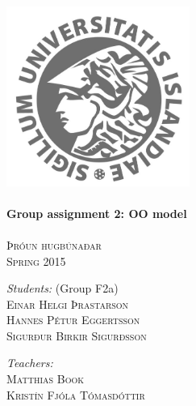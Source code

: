 \documentclass{article}
\begin{document}
\begin{titlepage}
\begin{center}
\textsc{}\\[2cm] 

\includegraphics[width=6cm]{Haskoli_Islands_rett.jpg}\\[0.5cm]

\HRule \\[0.6cm]
{ \huge \bfseries Group assignment 2: OO model}\\[0.2cm]
\HRule \\[0.4cm]

\textsc{\normalsize Þróun hugbúnaðar} \\
\textsc{Spring 2015} \\[1.5cm]

\begin{minipage}{0.45\textwidth}
\begin{flushleft} \large
\textit{Students:} (Group F2a)\\
\textsc{Einar Helgi Þrastarson} \\
\textsc{Hannes Pétur Eggertsson} \\
\textsc{Sigurður Birkir Sigurðsson} \\
\end{flushleft}
\end{minipage}
\begin{minipage}{0.45\textwidth}
\begin{flushright} \large
\textit{Teachers:} \\
\textsc{Matthias Book}\\
\textsc{Kristín Fjóla Tómasdóttir}\\
\textsc{ }\\
\end{flushright}
\end{minipage}

\end{center}
\end{titlepage}
\end{document}
